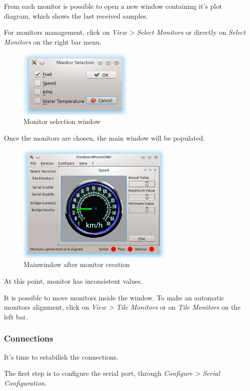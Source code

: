 \documentclass[twoside]{article}
\begin{document}
\begin{multicols}{2}
From each monitor is possible to open a new window containing it's plot diagram, which shows the last received samples.

For monitors management, click on \emph{View > Select Monitors} or directly on \emph{Select Monitors} on the right bar menu.

\begin{figure}[H]
  \centering
  \includegraphics[width=2.2in]{img/GUI/monitor_selection}
  \caption{Monitor selection window}
\end{figure}

Once the monitors are chosen, the main window will be populated.

\begin{figure}[H]
  \centering
  \includegraphics[width=3in]{img/GUI/monitor_created}
  \caption{Mainwindow after monitor creation}
\end{figure}

At this point, monitor has inconsistent values.

It is possible to move monitors inside the window. To make an automatic monitors alignment, click on \emph{View > Tile Monitors} or on \emph{Tile Monitors} on the left bar.

\subsubsection{Connections}

It's time to estabilish the connections.

The first step is to configure the serial port, through \emph{Configure > Serial Configuration}.


\end{multicols}
\end{document}
